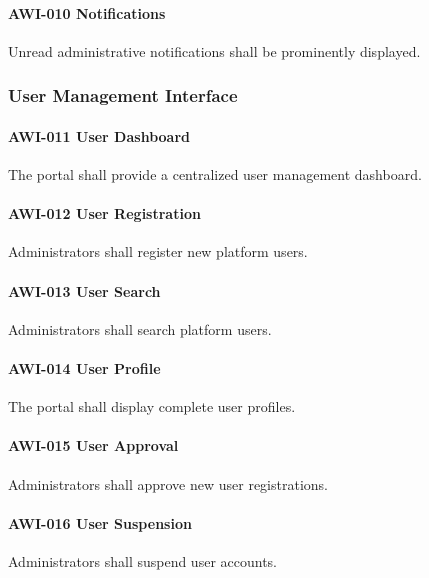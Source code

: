 \paragraph{AWI-010 Notifications}

Unread administrative notifications shall be prominently displayed.


\subsubsection*{User Management Interface}

\paragraph{AWI-011 User Dashboard}

The portal shall provide a centralized user management dashboard.

\paragraph{AWI-012 User Registration}

Administrators shall register new platform users.

\paragraph{AWI-013 User Search}

Administrators shall search platform users.

\paragraph{AWI-014 User Profile}

The portal shall display complete user profiles.

\paragraph{AWI-015 User Approval}

Administrators shall approve new user registrations.

\paragraph{AWI-016 User Suspension}

Administrators shall suspend user accounts.


